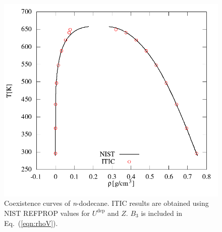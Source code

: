 \documentclass[%
 aip,
 jcp,
 sd,%
 amsmath,amssymb,
 reprint,%
]{revtex4-1}
\begin{document}
\begin{figure}
\includegraphics[scale=0.4]{Figures/NIST-VAL_FTT_trho.png}
\caption{Coexistence curves of \textit{n}-dodecane. ITIC results are obtained using NIST REFPROP values \cite{Lemmon2004} for $U^{\mathrm{dep}}$ and $Z$. $B_3$ is included in Eq.~(\ref{eqn:rhoV}).}
\label{fig:NIST-VAL-C12-FTT_BINODAL}
\end{figure}
\end{document}
